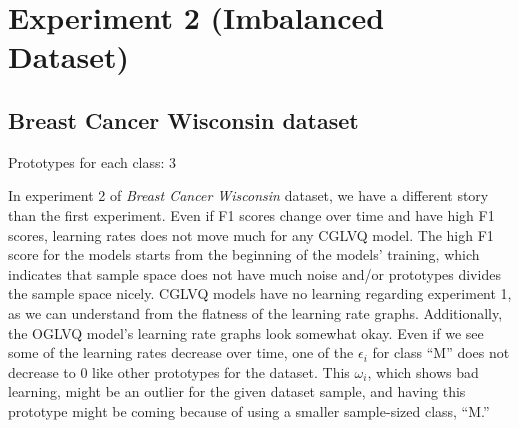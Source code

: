 \section{Experiment 2 (Imbalanced Dataset)}

\subsection{Breast Cancer Wisconsin dataset}

Prototypes for each class: 3
\vspace{5pt}


In experiment 2 of \textit{Breast Cancer Wisconsin} dataset, we have a different story than the first experiment. Even if F1 scores change over time and have high F1 scores, learning rates does not move much for any CGLVQ model. The high F1 score for the models starts from the beginning of the models’ training, which indicates that sample space does not have much noise and/or prototypes divides the sample space nicely. CGLVQ models have no learning regarding experiment 1, as we can understand from the flatness of the learning rate graphs. Additionally, the OGLVQ model’s learning rate graphs look somewhat okay. Even if we see some of the learning rates decrease over time, one of the $\epsilon_{i}$ for class “M” does not decrease to 0 like other prototypes for the dataset. This $\omega_{i}$, which shows bad learning, might be an outlier for the given dataset sample, and having this prototype might be coming because of using a smaller sample-sized class, “M.”


